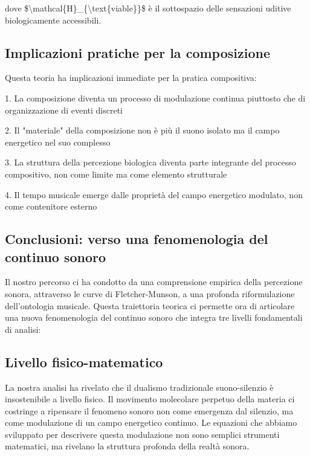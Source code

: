 \documentclass[a4paper,11pt]{article}
\begin{document}
dove \$\textbackslash{}mathcal\{H\}\_\{\textbackslash{}text\{viable\}\}\$ è il sottospazio delle sensazioni
uditive biologicamente accessibili.

\subsection{Implicazioni pratiche per la composizione}\hypertarget{implicazioni-pratiche-per-la-composizione}{}\label{implicazioni-pratiche-per-la-composizione}

Questa teoria ha implicazioni immediate per la pratica compositiva:

1. La composizione diventa un processo di modulazione continua
piuttosto che di organizzazione di eventi discreti

2. Il "materiale" della composizione non è più il suono isolato ma il
campo energetico nel suo complesso

3. La struttura della percezione biologica diventa parte integrante del
processo compositivo, non come limite ma come elemento strutturale

4. Il tempo musicale emerge dalle proprietà del campo energetico
modulato, non come contenitore esterno

\subsection{Conclusioni: verso una fenomenologia del continuo sonoro}\hypertarget{conclusioni-verso-una-fenomenologia-del-continuo-sonoro}{}\label{conclusioni-verso-una-fenomenologia-del-continuo-sonoro}

Il nostro percorso ci ha condotto da una comprensione empirica della
percezione sonora, attraverso le curve di Fletcher-Munson, a una
profonda riformulazione dell'ontologia musicale. Questa traiettoria
teorica ci permette ora di articolare una nuova fenomenologia del
continuo sonoro che integra tre livelli fondamentali di analisi:

\subsection{Livello fisico-matematico}\hypertarget{livello-fisico-matematico}{}\label{livello-fisico-matematico}

La nostra analisi ha rivelato che il dualismo tradizionale
suono-silenzio è insostenibile a livello fisico. Il movimento molecolare
perpetuo della materia ci costringe a ripensare il fenomeno sonoro non
come emergenza dal silenzio, ma come modulazione di un campo energetico
continuo. Le equazioni che abbiamo sviluppato per descrivere questa
modulazione non sono semplici strumenti matematici, ma rivelano la
struttura profonda della realtà sonora.
\end{document}
